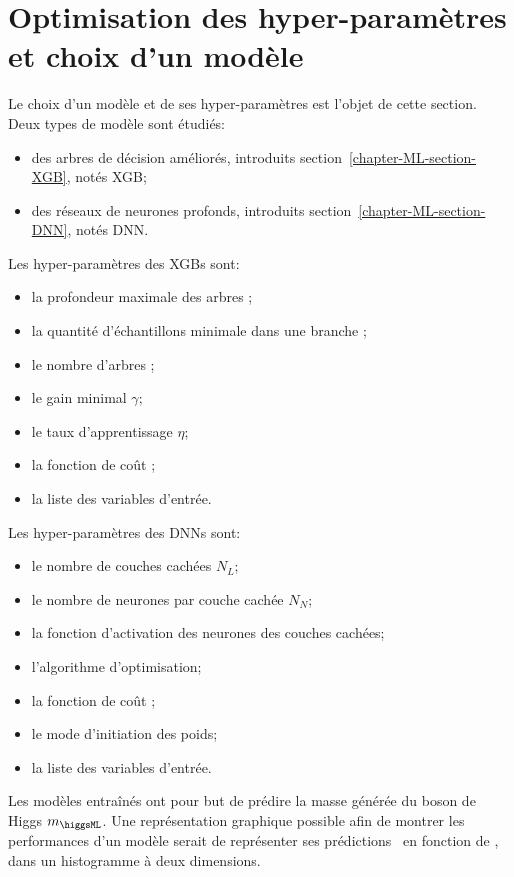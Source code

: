 \section{Optimisation des hyper-paramètres et choix d'un modèle}\label{chapter-ML-section-hyperparameters}
Le choix d'un modèle et de ses hyper-paramètres est l'objet de cette section.
Deux types de modèle sont étudiés:
\begin{itemize}
\item des arbres de décision améliorés, introduits section~\ref{chapter-ML-section-XGB}, notés XGB;
\item des réseaux de neurones profonds, introduits section~\ref{chapter-ML-section-DNN}, notés DNN.
\end{itemize}
\par
Les hyper-paramètres des XGBs sont:
\begin{itemize}
\item la profondeur maximale des arbres \MaxDepth;
\item la quantité d'échantillons minimale dans une branche \MinChildWeight;
\item le nombre d'arbres \Nestimators;
\item le gain minimal $\gamma$;
\item le taux d'apprentissage $\eta$;
\item la fonction de coût \Loss;
\item la liste des variables d'entrée.
\end{itemize}
Les hyper-paramètres des DNNs sont:
\begin{itemize}
\item le nombre de couches cachées $N_L$;
\item le nombre de neurones par couche cachée $N_N$;
\item la fonction d'activation des neurones des couches cachées;
\item l'algorithme d'optimisation;
\item la fonction de coût \Loss;
\item le mode d'initiation des poids;
\item la liste des variables d'entrée.
\end{itemize}
\par
Les modèles entraînés ont pour but de prédire la masse générée du boson de Higgs $m_{\higgsML}$.
Une représentation graphique possible afin de montrer les performances d'un modèle serait de représenter ses prédictions \ypred\ en fonction de \ytrue, dans un histogramme à deux dimensions.
